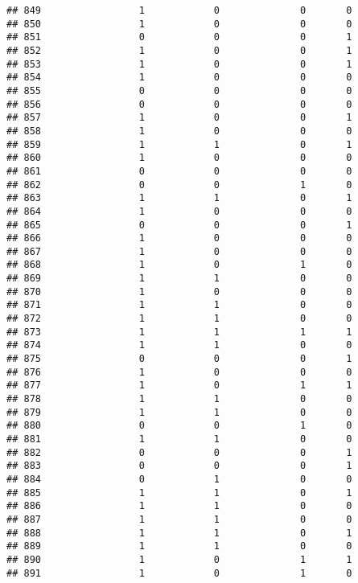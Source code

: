 \documentclass[]{article}
\begin{document}
\begin{verbatim}
## 849                 1            0              0       0
## 850                 1            0              0       0
## 851                 0            0              0       1
## 852                 1            0              0       1
## 853                 1            0              0       1
## 854                 1            0              0       0
## 855                 0            0              0       0
## 856                 0            0              0       0
## 857                 1            0              0       1
## 858                 1            0              0       0
## 859                 1            1              0       1
## 860                 1            0              0       0
## 861                 0            0              0       0
## 862                 0            0              1       0
## 863                 1            1              0       1
## 864                 1            0              0       0
## 865                 0            0              0       1
## 866                 1            0              0       0
## 867                 1            0              0       0
## 868                 1            0              1       0
## 869                 1            1              0       0
## 870                 1            0              0       0
## 871                 1            1              0       0
## 872                 1            1              0       0
## 873                 1            1              1       1
## 874                 1            1              0       0
## 875                 0            0              0       1
## 876                 1            0              0       0
## 877                 1            0              1       1
## 878                 1            1              0       0
## 879                 1            1              0       0
## 880                 0            0              1       0
## 881                 1            1              0       0
## 882                 0            0              0       1
## 883                 0            0              0       1
## 884                 0            1              0       0
## 885                 1            1              0       1
## 886                 1            1              0       0
## 887                 1            1              0       0
## 888                 1            1              0       1
## 889                 1            1              0       0
## 890                 1            0              1       1
## 891                 1            0              1       0

\end{verbatim}
\end{document}
